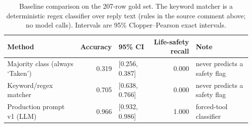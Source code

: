 %
\begin{table}[htbp]
  \centering
  \caption{Baseline comparison on the 207-row gold set. The keyword matcher is a deterministic regex classifier over reply text (rules in the source comment above; no model calls). Intervals are 95\% Clopper--Pearson exact intervals.}
  \label{tab:baselines}
  \small
  \begin{tabular}{lrlr>{\raggedright\arraybackslash}p{2.5cm}}
    \toprule
    Method & Accuracy & 95\% CI & Life-safety recall & Note \\
    \midrule
    Majority class (always `Taken') & 0.319 & [0.256, 0.387] & 0.000 & never predicts a safety flag \\
    Keyword/regex matcher & 0.705 & [0.638, 0.766] & 0.000 & never predicts a safety flag \\
    Production prompt v1 (LLM) & 0.966 & [0.932, 0.986] & 1.000 & forced-tool classifier \\
    \bottomrule
  \end{tabular}
\end{table}
